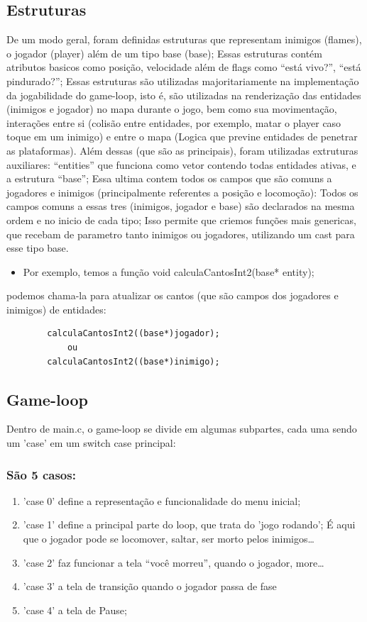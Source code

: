\documentclass[11pt]{article}
\begin{document}
\subsection{Estruturas}
\label{sec:org892b55c}
De um modo geral, foram definidas estruturas que representam inimigos (flames), o jogador (player) além de um tipo base (base);
Essas estruturas contém atributos basicos como posição, velocidade além de flags como ``está vivo?'', ``está pindurado?'';
Essas estruturas são utilizadas majoritariamente na implementação da jogabilidade do game-loop, isto é, são utilizadas na renderização das entidades (inimigos e jogador) no mapa durante o jogo, bem como sua movimentação, interações entre si (colisão entre entidades, por exemplo, matar o player caso toque em um inimigo) e entre o mapa (Logica que previne entidades de penetrar as plataformas).
Além dessas (que são as principais), foram utilizadas extruturas auxiliares: ``entities'' que funciona como vetor contendo todas entidades ativas, e a estrutura ``base'';
Essa ultima contem todos os campos que são comuns a jogadores e inimigos (principalmente referentes a posição e locomoção):
Todos os campos comuns a essas tres (inimigos, jogador e base) são declarados na mesma ordem e no inicio de cada tipo;
Isso permite que criemos funções mais genericas, que recebam de parametro tanto inimigos ou jogadores, utilizando um cast para esse tipo base.
\begin{itemize}
\item Por exemplo, temos a função
void calculaCantosInt2(base* entity);
\end{itemize}
podemos chama-la para atualizar os cantos (que são campos dos jogadores e inimigos) de entidades:
\begin{verbatim}
        calculaCantosInt2((base*)jogador);
            ou
        calculaCantosInt2((base*)inimigo);
\end{verbatim}
\subsection{Game-loop}
\label{sec:orga459536}
Dentro de main.c, o game-loop se divide em algumas subpartes, cada uma sendo um 'case' em um switch case principal:
\subsubsection{São 5 casos:}
\label{sec:orgad30165}
\begin{enumerate}
\item 'case 0' define a representação e funcionalidade do menu inicial;
\item 'case 1' define a principal parte do loop, que trata do 'jogo rodando';
É aqui que o jogador pode se locomover, saltar, ser morto pelos inimigos\ldots{}
\item 'case 2' faz funcionar a tela ``você morreu'', quando o jogador, more\ldots{}
\item 'case 3' a tela de transição quando o jogador passa de fase
\item 'case 4' a tela de Pause;
\end{enumerate}
\end{document}
